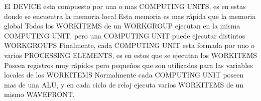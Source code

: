 El DEVICE esta compuesto por una o mas COMPUTING UNITS, es en estas donde se
encuentra la memoria local Esta memoria es mas rápida que la memoria global
Todos los WORKITEMS de un WORKGROUP ejecutan en la misma COMPUTING UNIT, pero
una COMPUTING UNIT puede ejecutar distintos WORKGROUPS Finalmente, cada
COMPUTING UNIT esta formada por uno o varios PROCESSING ELEMENTS, es en estos
que se ejecutan los WORKITEMS Poseen registros muy rápidos pero pequeños que son
utilizados para las variables locales de los WORKITEMS Normalmente cada
COMPUTING UNIT poseen mas de una ALU, y en cada ciclo de reloj ejecuta varios
WORKITEMS de un mismo WAVEFRONT.
